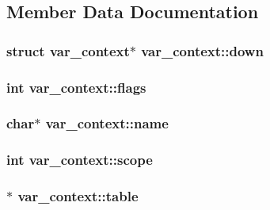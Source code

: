 \subsection{Member Data Documentation}
\subsubsection[{\texorpdfstring{down}{down}}]{\setlength{\rightskip}{0pt plus 5cm}struct {\bf var\+\_\+context}$\ast$ var\+\_\+context\+::down}\hypertarget{structvar__context_aec918162dabf8df65cdb881279f43277}{}\label{structvar__context_aec918162dabf8df65cdb881279f43277}
\subsubsection[{\texorpdfstring{flags}{flags}}]{\setlength{\rightskip}{0pt plus 5cm}int var\+\_\+context\+::flags}\hypertarget{structvar__context_a9570eb7deb9d92355f507e437f7112c0}{}\label{structvar__context_a9570eb7deb9d92355f507e437f7112c0}
\subsubsection[{\texorpdfstring{name}{name}}]{\setlength{\rightskip}{0pt plus 5cm}char$\ast$ var\+\_\+context\+::name}\hypertarget{structvar__context_adf16b336746df59643044d0688a4d593}{}\label{structvar__context_adf16b336746df59643044d0688a4d593}
\subsubsection[{\texorpdfstring{scope}{scope}}]{\setlength{\rightskip}{0pt plus 5cm}int var\+\_\+context\+::scope}\hypertarget{structvar__context_a616bf2696f42da3a8d3f8342eaf936fb}{}\label{structvar__context_a616bf2696f42da3a8d3f8342eaf936fb}
\subsubsection[{\texorpdfstring{table}{table}}]{$\ast$ var\+\_\+context\+::table}\hypertarget{structvar__context_ae3392829999a8c3470675cd298d3eb73}{}\label{structvar__context_ae3392829999a8c3470675cd298d3eb73}

